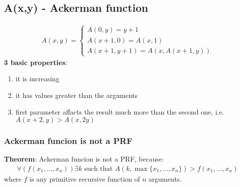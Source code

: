 \documentclass{article}
\begin{document}



\pagebreak[4]

\subsection{A(x,y) - Ackerman function}
\begin{gather*}
A(x,y) = \begin{cases}
A(0,y) = y+1 \\
A(x+1,0) = A(x,1) \\
A(x+1,y+1) = A(x,A(x+1,y))
\end{cases}
\end{gather*}
\noindent \textbf{3 basic properties}:
\begin{enumerate}
  \item it is increasing
  \item it has values greater than the arguments
  \item first parameter affacts the result much more than the second one, i.e. $A(x+2,y) > A(x,2y) $
\end{enumerate}

\subsubsection{Ackerman funcion is not a PRF}
\textbf{Theorem}: Ackerman funcion is not a PRF, because:
\begin{gather*}
\forall(f(x_1,\ldots,x_n))\exists k \mbox{ such that } A(k,\max\{x_1,\ldots,x_n\}) > f(x_1,\ldots,x_n)
\end{gather*}
where $f$ is any primitive recursive function of $n$ arguments.
\end{document}
